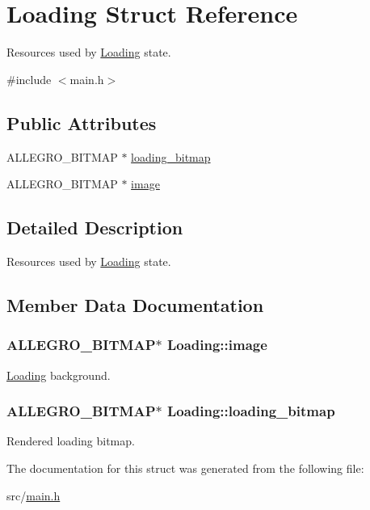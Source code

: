 \hypertarget{structLoading}{\section{\-Loading \-Struct \-Reference}
\label{structLoading}
}


\-Resources used by \hyperlink{structLoading}{\-Loading} state.  




{\ttfamily \#include $<$main.\-h$>$}

\subsection*{\-Public \-Attributes}
\begin{DoxyCompactItemize}
\item 
\-A\-L\-L\-E\-G\-R\-O\-\_\-\-B\-I\-T\-M\-A\-P $\ast$ \hyperlink{structLoading_aa6c655f5a0c41583f9c1a547ca81b98b}{loading\-\_\-bitmap}
\item 
\-A\-L\-L\-E\-G\-R\-O\-\_\-\-B\-I\-T\-M\-A\-P $\ast$ \hyperlink{structLoading_a1d0c3f575a47ca8928fe0b5af85059c9}{image}
\end{DoxyCompactItemize}


\subsection{\-Detailed \-Description}
\-Resources used by \hyperlink{structLoading}{\-Loading} state. 

\subsection{\-Member \-Data \-Documentation}
\hypertarget{structLoading_a1d0c3f575a47ca8928fe0b5af85059c9}{
\subsubsection[{image}]{\setlength{\rightskip}{0pt plus 5cm}\-A\-L\-L\-E\-G\-R\-O\-\_\-\-B\-I\-T\-M\-A\-P$\ast$ {\bf \-Loading\-::image}}}\label{structLoading_a1d0c3f575a47ca8928fe0b5af85059c9}
\hyperlink{structLoading}{\-Loading} background. \hypertarget{structLoading_aa6c655f5a0c41583f9c1a547ca81b98b}{
\subsubsection[{loading\-\_\-bitmap}]{\setlength{\rightskip}{0pt plus 5cm}\-A\-L\-L\-E\-G\-R\-O\-\_\-\-B\-I\-T\-M\-A\-P$\ast$ {\bf \-Loading\-::loading\-\_\-bitmap}}}\label{structLoading_aa6c655f5a0c41583f9c1a547ca81b98b}
\-Rendered loading bitmap. 

\-The documentation for this struct was generated from the following file\-:\begin{DoxyCompactItemize}
\item 
src/\hyperlink{main_8h}{main.\-h}\end{DoxyCompactItemize}

